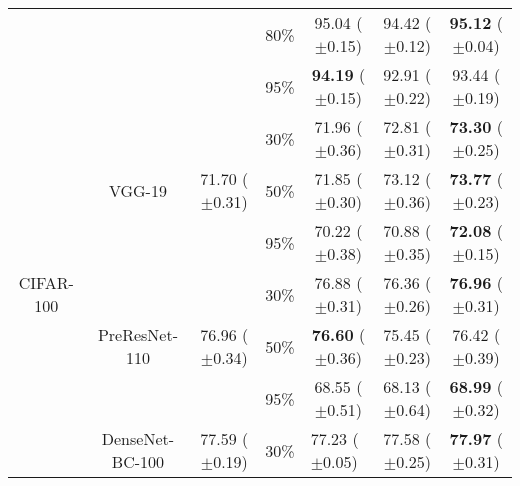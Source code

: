 \begin{table}[!htbp]
{\begin{tabular}{c|c|ccccc}
\multicolumn{1}{c|}{}                          &                                  &                                    & 80\%        & 95.04 ($\pm$0.15)                           & 94.42  ($\pm$0.12)                          & \textbf{95.12} ($\pm$0.04) \\ \multicolumn{1}{c|}{}                          &                                  &                                    & 95\%        & \textbf{94.19} ($\pm$0.15)                           &  92.91 ($\pm$0.22)  & 93.44 ($\pm$0.19) \\ \hline
\multirow{9}{*}{CIFAR-100}                                      & \multirow{3}{*}{VGG-19}          & \multirow{3}{*}{71.70 ($\pm$0.31)} & 30\%        & 71.96 ($\pm$0.36)                           & 72.81 ($\pm$0.31)                           & \textbf{73.30} ($\pm$0.25)                           \\
                                               &                                  &                                    & 50\%        & 71.85 ($\pm$0.30)                           & 73.12 ($\pm$0.36)                           & \textbf{73.77} ($\pm$0.23) \\
                                             &                                  &                                    & 95\%        & 70.22 ($\pm$0.38)                           & 70.88 ($\pm$0.35)                           & \textbf{72.08} ($\pm$0.15) \\ \cline{2-7} 
                                               & \multirow{3}{*}{PreResNet-110}   & \multirow{3}{*}{76.96 ($\pm$0.34)} & 30\%        & \multicolumn{1}{c}{76.88 ($\pm$0.31)}       & \multicolumn{1}{c}{76.36 ($\pm$0.26)}       & \textbf{76.96} ($\pm$0.31)                           \\
                                               &                                  &                                    & 50\%        & \textbf{76.60} ($\pm$0.36) & 75.45 ($\pm$0.23)                           & 76.42 ($\pm$0.39)                           \\
                                                                                              &                                  &                                    & 95\%        & 68.55 ($\pm$0.51) & 68.13 ($\pm$0.64)                           & \textbf{68.99} ($\pm$0.32)                           \\ \cline{2-7} 
                                               & \multirow{3}{*}{DenseNet-BC-100}                  & \multirow{3}{*}{77.59 ($\pm$0.19)}                  & 30\%        & \multicolumn{1}{l}{77.23 ($\pm$0.05)}       & 77.58 ($\pm$0.25)                           & \textbf{77.97} ($\pm$0.31) \\

\end{tabular}}
\end{table}
